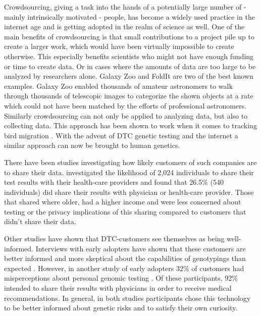 \documentclass[10pt]{article}
\begin{document}
Crowdsourcing, giving a task into the hands of a potentially large number of - mainly intrinsically motivated - people, has become a widely used practice in the internet age and is getting adopted in the realm of science as well. One of the main benefits of crowdsourcing is that small contributions to a project pile up to create a larger work, which would have been virtually impossible to create otherwise. This especially benefits scientists who might not have enough funding or time to create data. Or in cases where the amounts of data are too large to be analyzed by researchers alone. %
 Galaxy Zoo and FoldIt \cite{Eiben2012, GalaxyZoo} are two of the best known examples. 
Galaxy Zoo enabled thousands of amateur astronomers to walk through thousands of telescopic images to categorize the shown objects at a rate which could not have been matched by the efforts of professional astronomers.
Similarly crowdsourcing can not only be applied to analyzing data, but also to collecting data. This approach has been shown to work when it comes to tracking bird migration \cite{CrowdsourcingReview2010}. With the advent of DTC genetic testing and the internet a similar approach can now be brought to human genetics.

There have been studies investigating how likely customers of such companies are to share their data. \cite{Darst2013} investigated the likelihood of 2,024 individuals to share their test results with their health-care providers and found that 26.5\% (540 individuals) did share their results with physician or health-care provider. Those that shared where older, had a higher income and were less concerned about testing or the privacy implications of this sharing compared to customers that didn't share their data.

Other studies have shown that DTC-customers see themselves as being well-informed. Interviews with early adopters have shown that these customers are better informed and more skeptical about the capabilities of genotypings than expected \cite{McGowan2010}. However, in another study of early adopters 32\% of customers had misperceptions about personal genomic testing \cite{Gollust2012}. Of these participants, 92\% intended to share their results with physicians in order to receive medical recommendations. In general, in both studies participants chose this technology to be better informed about genetic risks and to satisfy their own curiosity. 
\end{document}
